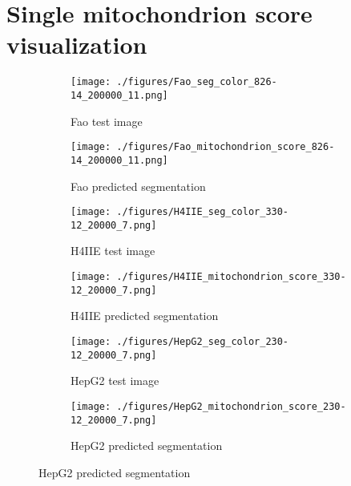 \section{Single mitochondrion score visualization}


\begin{figure}[htb]
    \begin{subfigure}{.5\textwidth}
         \centering
        \texttt{[image: ./figures/Fao\_seg\_color\_826-14\_200000\_11.png]}
        \caption{Fao test image}
        \label{fig:fao_raw}
    \end{subfigure}
  \begin{subfigure}{.5\textwidth}
        \centering
       \texttt{[image: ./figures/Fao\_mitochondrion\_score\_826-14\_200000\_11.png]}
        \caption{Fao predicted segmentation}
        \label{fig:healthy_raw}
    \end{subfigure}
    
    
     \begin{subfigure}{.5\textwidth}
         \centering
        \texttt{[image: ./figures/H4IIE\_seg\_color\_330-12\_20000\_7.png]}
        \caption{H4IIE test image}
        \label{fig:fao_raw}
    \end{subfigure}
  \begin{subfigure}{.5\textwidth}
        \centering
       \texttt{[image: ./figures/H4IIE\_mitochondrion\_score\_330-12\_20000\_7.png]}
        \caption{H4IIE predicted segmentation}
        \label{fig:healthy_raw}
    \end{subfigure}
    
    
     \begin{subfigure}{.5\textwidth}
         \centering
        \texttt{[image: ./figures/HepG2\_seg\_color\_230-12\_20000\_7.png]}
        \caption{HepG2 test image}
      \label{fig:hepg2_test}
    \end{subfigure}
  \begin{subfigure}{.5\textwidth}
        \centering
       \texttt{[image: ./figures/HepG2\_mitochondrion\_score\_230-12\_20000\_7.png]}
        \caption{HepG2 predicted segmentation}
       \end{subfigure}
    \end{figure}
